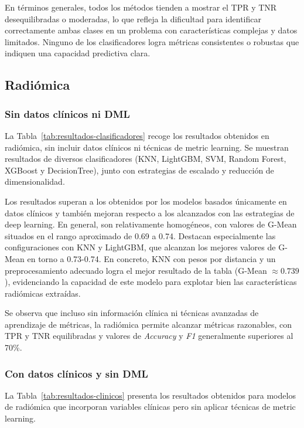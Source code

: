 En términos generales, todos los métodos tienden a mostrar el TPR y TNR desequilibradas o moderadas, lo que refleja la dificultad para identificar correctamente ambas clases en un problema con características complejas y datos limitados. Ninguno de los clasificadores logra métricas consistentes o robustas que indiquen una capacidad predictiva clara.


\subsection{Radiómica}
\subsubsection{Sin datos clínicos ni DML}
La Tabla~\ref{tab:resultados-clasificadores} recoge los resultados obtenidos en radiómica, sin incluir datos clínicos ni técnicas de metric learning. Se muestran resultados de diversos clasificadores (KNN, LightGBM, SVM, Random Forest, XGBoost y DecisionTree), junto con estrategias de escalado y reducción de dimensionalidad.

Los resultados superan a los obtenidos por los modelos basados únicamente en datos clínicos y también mejoran respecto a los alcanzados con las estrategias de deep learning. En general, son relativamente homogéneos, con valores de G-Mean situados en el rango aproximado de 0.69 a 0.74. Destacan especialmente las configuraciones con KNN y LightGBM, que alcanzan los mejores valores de G-Mean en torno a 0.73-0.74. En concreto, KNN con pesos por distancia y un preprocesamiento adecuado logra el mejor resultado de la tabla (G-Mean $\approx 0.739$), evidenciando la capacidad de este modelo para explotar bien las características radiómicas extraídas.

Se observa que incluso sin información clínica ni técnicas avanzadas de aprendizaje de métricas, la radiómica permite alcanzar métricas razonables, con TPR y TNR equilibradas y valores de \textit{Accuracy} y \textit{F1} generalmente superiores al 70\%.



\subsubsection{Con datos clínicos y sin DML}
La Tabla~\ref{tab:resultados-clinicos} presenta los resultados obtenidos para modelos de radiómica que incorporan variables clínicas pero sin aplicar técnicas de metric learning.

